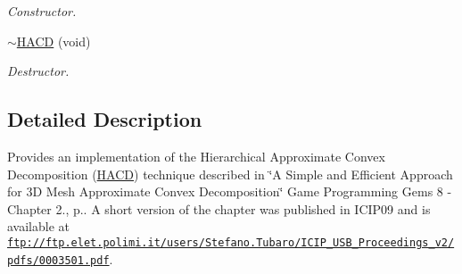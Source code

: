\begin{DoxyCompactItemize}
\begin{DoxyCompactList}\small\item\em Constructor. \end{DoxyCompactList}\item 
\hypertarget{class_h_a_c_d_1_1_h_a_c_d_a38511d80e4d64632fa080dfed54f59d7}{\hyperlink{class_h_a_c_d_1_1_h_a_c_d_a38511d80e4d64632fa080dfed54f59d7}{$\sim$\+H\+A\+C\+D} (void)}\label{class_h_a_c_d_1_1_h_a_c_d_a38511d80e4d64632fa080dfed54f59d7}

\begin{DoxyCompactList}\small\item\em Destructor. \end{DoxyCompactList}\end{DoxyCompactItemize}


\subsection{Detailed Description}
Provides an implementation of the Hierarchical Approximate Convex Decomposition (\hyperlink{class_h_a_c_d_1_1_h_a_c_d}{H\+A\+C\+D}) technique described in \char`\"{}\+A Simple and Efficient Approach for 3\+D Mesh Approximate Convex Decomposition\char`\"{} Game Programming Gems 8 -\/ Chapter 2., p.. A short version of the chapter was published in I\+C\+I\+P09 and is available at \href{ftp://ftp.elet.polimi.it/users/Stefano.Tubaro/ICIP_USB_Proceedings_v2/pdfs/0003501.pdf}{\tt ftp\+://ftp.\+elet.\+polimi.\+it/users/\+Stefano.\+Tubaro/\+I\+C\+I\+P\+\_\+\+U\+S\+B\+\_\+\+Proceedings\+\_\+v2/pdfs/0003501.\+pdf}. 

